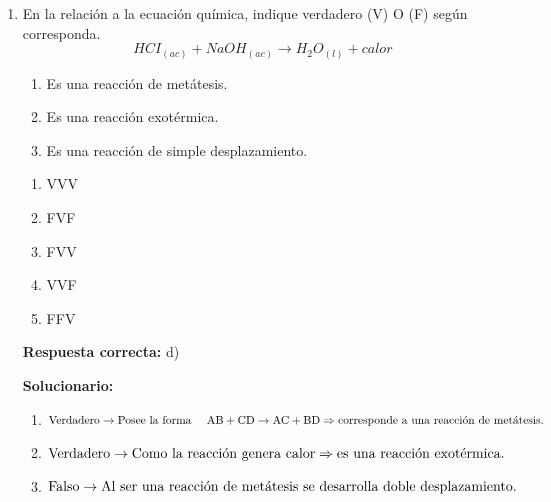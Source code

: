 \begin{enumerate}[resume]
	
	\item En la relación a la ecuación química, indique verdadero (V) O (F) según corresponda.
	\[HC{I_{(ac)}} + NaO{H_{(ac)}} \to {H_2}{O_{(l)}} + calor\]
	
	\begin{enumerate}[label=\Roman*.]
		\item Es una reacción de metátesis.
		\item Es una reacción exotérmica.
		\item Es una reacción de simple desplazamiento.
	\end{enumerate}
	
	
	\begin{enumerate}[label=\alph*)]
		\item VVV
		\item FVF
		\item FVV
		\item VVF
		\item FFV
	\end{enumerate}
	
	\textbf{Respuesta correcta:} d)
	
	\vspace{2mm}
	\textbf{Solucionario:}\\
	
	
	\begin{enumerate}[label=\Roman*.]
		\item ${\rm{Verdadero}} \to \text{Posee la forma}\,\,\,\,\,\,\,\,{\rm{AB}} + {\rm{CD}} \to {\rm{AC}} + {\rm{BD}}\\
		{\rm{   }} \Rightarrow {\text{corresponde a una reacción de metátesis. }}$
		
		\item ${\rm{Verdadero}} \to \text{Como la reacción genera calor}\\
		{\rm{   }} \Rightarrow {\text{es una reacción exotérmica. }}$
		
		\item ${\rm{Falso}} \to \text{Al ser una reacción de metátesis se desarrolla doble desplazamiento.}$\\
		
	\end{enumerate}
	
\end{enumerate}


